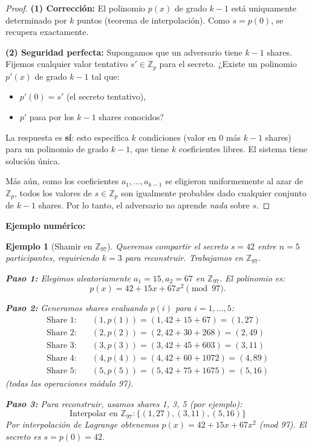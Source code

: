 \documentclass[a4paper,11pt]{report}
\newtheorem{example}[theorem]{Ejemplo}
\begin{document}
\begin{proof}
\textbf{(1) Corrección:} El polinomio $p(x)$ de grado $k-1$ está uniquamente determinado por $k$ puntos (teorema de interpolación). Como $s = p(0)$, se recupera exactamente.

\textbf{(2) Seguridad perfecta:} Supongamos que un adversario tiene $k-1$ shares. Fijemos cualquier valor tentativo $s' \in \mathbb{Z}_p$ para el secreto. ¿Existe un polinomio $p'(x)$ de grado $k-1$ tal que:
\begin{itemize}
\item $p'(0) = s'$ (el secreto tentativo),
\item $p'$ pasa por los $k-1$ shares conocidos?
\end{itemize}

La respuesta es \textbf{sí}: esto especifica $k$ condiciones (valor en $0$ más $k-1$ shares) para un polinomio de grado $k-1$, que tiene $k$ coeficientes libres. El sistema tiene solución única.

Más aún, como los coeficientes $a_1, \ldots, a_{k-1}$ se eligieron uniformemente al azar de $\mathbb{Z}_p$, todos los valores de $s \in \mathbb{Z}_p$ son igualmente probables dado cualquier conjunto de $k-1$ shares. Por lo tanto, el adversario no aprende \textit{nada} sobre $s$.
\end{proof}

\textbf{Ejemplo numérico:}

\begin{example}[Shamir en $\mathbb{Z}_{97}$]
Queremos compartir el secreto $s = 42$ entre $n = 5$ participantes, requiriendo $k = 3$ para reconstruir. Trabajamos en $\mathbb{Z}_{97}$.

\textbf{Paso 1:} Elegimos aleatoriamente $a_1 = 15, a_2 = 67$ en $\mathbb{Z}_{97}$. El polinomio es:
\[
p(x) = 42 + 15x + 67x^2 \pmod{97}.
\]

\textbf{Paso 2:} Generamos shares evaluando $p(i)$ para $i = 1, \ldots, 5$:
\begin{align*}
\text{Share 1:} &\quad (1, p(1)) = (1, 42 + 15 + 67) = (1, 27) \\
\text{Share 2:} &\quad (2, p(2)) = (2, 42 + 30 + 268) = (2, 49) \\
\text{Share 3:} &\quad (3, p(3)) = (3, 42 + 45 + 603) = (3, 11) \\
\text{Share 4:} &\quad (4, p(4)) = (4, 42 + 60 + 1072) = (4, 89) \\
\text{Share 5:} &\quad (5, p(5)) = (5, 42 + 75 + 1675) = (5, 16)
\end{align*}
(todas las operaciones módulo 97).

\textbf{Paso 3:} Para reconstruir, usamos shares 1, 3, 5 (por ejemplo):
\[
\text{Interpolar en } \mathbb{Z}_{97}: \{(1, 27), (3, 11), (5, 16)\}
\]
Por interpolación de Lagrange obtenemos $p(x) = 42 + 15x + 67x^2$ (mod 97).
El secreto es $s = p(0) = 42$.
\end{example}
\end{document}

